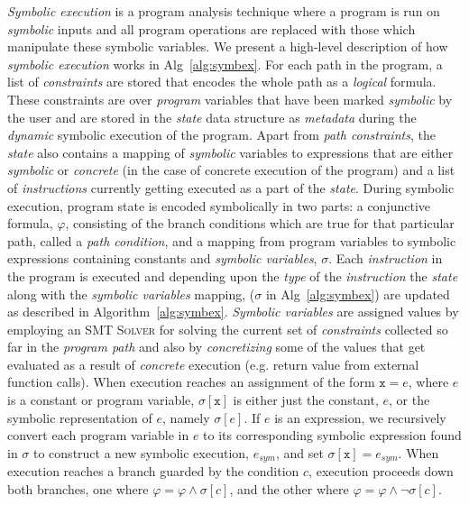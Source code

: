 \textit{Symbolic execution} is a program analysis technique where a program is run on \textit{symbolic} inputs and all program operations are replaced with those which manipulate these symbolic variables.
%
We present a high-level description of how \textit{symbolic execution} works in Alg~\ref{alg:symbex}. 
% 
For each path in the program, a list of \textit{constraints} are stored that encodes the whole path as a \textit{logical}
formula.
% 
These constraints are over \textit{program} variables that have been marked \textit{symbolic} by the user and are stored in the \textit{state} data structure as \textit{metadata} during the \textit{dynamic} symbolic execution of the program.
% 
Apart from \textit{path constraints}, the \textit{state} also contains a mapping of \textit{symbolic} variables to expressions that are either  \textit{symbolic} or \textit{concrete} (in the case of concrete execution of the program) and a list of \textit{instructions} currently getting executed as a part of the \textit{state}.	
% 
During symbolic execution, program state is encoded symbolically in two parts: a conjunctive formula, $\varphi$, consisting of the branch conditions which are true for that particular path, called a \textit{path condition}, and a mapping from program variables to symbolic expressions containing constants and \textit{symbolic variables}, $\sigma$.
% 
Each \textit{instruction} in the program is executed and depending upon the \textit{type} of the \textit{instruction} the \textit{state} along with the \textit{symbolic variables} mapping, ($\sigma$ in Alg~\ref{alg:symbex}) are updated as described in Algorithm~\ref{alg:symbex}.
% 
\textit{Symbolic variables} are assigned values by employing an \textsc{SMT Solver} for solving the current set of \textit{constraints} collected so far in the \textit{program path} and also by \textit{concretizing} some of the values that get evaluated as a result of \textit{concrete} execution (e.g. return value from external function calls).
%
When execution reaches an assignment of the form $\mathtt{x} = e$, where $e$ is a constant or program variable, $\sigma[\mathtt{x}]$ is either just the constant, $e$, or the symbolic representation of $e$, namely $\sigma[e]$.
% 
If $e$ is an expression, we recursively convert each program variable in $e$ to its corresponding symbolic expression found in $\sigma$ to construct a new symbolic execution, $e_{sym}$, and set $\sigma[\mathtt{x}] = e_{sym}$.
% 
When execution reaches a branch guarded by the condition $c$, execution proceeds down both branches, one where $\varphi = \varphi \wedge \sigma[c]$, and the other where $\varphi = \varphi \wedge \neg \sigma[c]$. 


